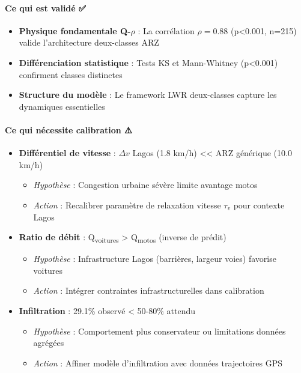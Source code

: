 \paragraph{Ce qui est validé ✅}
\begin{itemize}
    \item \textbf{Physique fondamentale Q-$\rho$} : La corrélation $\rho=0.88$ (p<0.001, n=215) valide l'architecture deux-classes ARZ
    \item \textbf{Différenciation statistique} : Tests KS et Mann-Whitney (p<0.001) confirment classes distinctes
    \item \textbf{Structure du modèle} : Le framework LWR deux-classes capture les dynamiques essentielles
\end{itemize}

\paragraph{Ce qui nécessite calibration ⚠️}
\begin{itemize}
    \item \textbf{Différentiel de vitesse} : $\Delta v$ Lagos (1.8 km/h) << ARZ générique (10.0 km/h)
          \begin{itemize}
              \item \textit{Hypothèse} : Congestion urbaine sévère limite avantage motos
              \item \textit{Action} : Recalibrer paramètre de relaxation vitesse $\tau_v$ pour contexte Lagos
          \end{itemize}
    \item \textbf{Ratio de débit} : Q\textsubscript{voitures} > Q\textsubscript{motos} (inverse de prédit)
          \begin{itemize}
              \item \textit{Hypothèse} : Infrastructure Lagos (barrières, largeur voies) favorise voitures
              \item \textit{Action} : Intégrer contraintes infrastructurelles dans calibration
          \end{itemize}
    \item \textbf{Infiltration} : 29.1\% observé < 50-80\% attendu
          \begin{itemize}
              \item \textit{Hypothèse} : Comportement plus conservateur ou limitations données agrégées
              \item \textit{Action} : Affiner modèle d'infiltration avec données trajectoires GPS
          \end{itemize}
\end{itemize}

